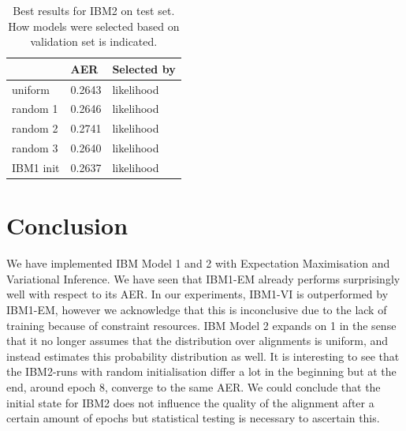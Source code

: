 \documentclass[11pt,a4paper]{article}
\begin{document}
\begin{table}
\begin{tabular}{ |p{2cm}||p{2cm}||p{2cm}| }
 \hline
    & AER & Selected by \\
 \hline
 uniform    &  0.2643  &    likelihood \\
 random 1   & 0.2646   &   likelihood \\
 random 2   & 0.2741   &   likelihood \\
 random 3   & 0.2640   &    likelihood \\
 IBM1 init      & 0.2637  &    likelihood \\
 \hline
\end{tabular}
\caption{Best results for IBM2 on test set. How models were selected based on validation set is indicated.}
\label{table:results-2}
\end{table}


\section{Conclusion}

We have implemented IBM Model 1 and 2 with Expectation Maximisation and Variational Inference. We have seen that IBM1-EM already performs surprisingly well with respect to its AER. In our experiments, IBM1-VI is outperformed by IBM1-EM, however we acknowledge that this is inconclusive due to the lack of training because of constraint resources. IBM Model 2 expands on 1 in the sense that it no longer assumes that the distribution over alignments is uniform, and instead estimates this probability distribution as well. 
It is interesting to see that the IBM2-runs with random initialisation differ a lot in the beginning but at the end, around epoch 8, converge to the same AER. We could conclude that the initial state for IBM2 does not influence the quality of the alignment after a certain amount of epochs but statistical testing is necessary to ascertain this. 





\end{document}
